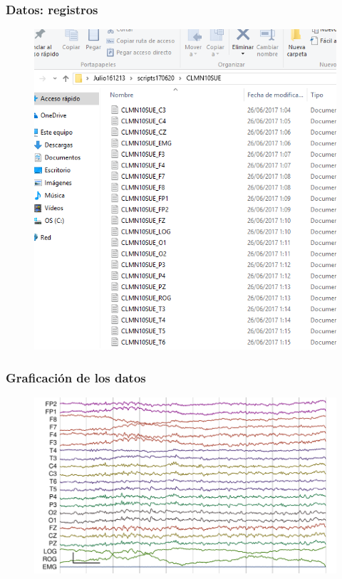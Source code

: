 \documentclass[serif,mathserif,professionalfont]{beamer}
\begin{document}

\begin{frame}\frametitle{Datos: registros}
\begin{figure}
\centering
\includegraphics[width=0.7\linewidth]{./curso_scripts/archivos.png}
\end{figure}
\end{frame}


\begin{frame}\frametitle{Graficación de los datos}
\begin{figure}
\centering
\includegraphics[width=\linewidth]{./img_ejemplos/MJNN_epoca_stam.pdf}
\end{figure}
\end{frame}

\end{document}

